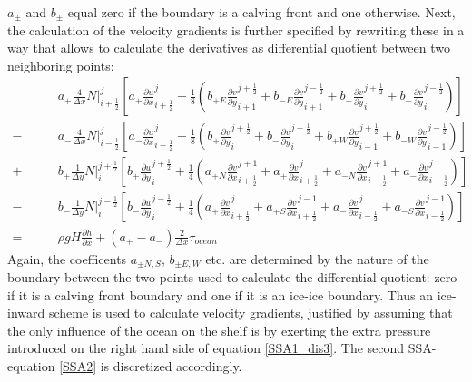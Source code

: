 \documentclass[a4paper,10pt]{article}
\begin{document}
$a_\pm$ and $b_\pm$ equal zero if the boundary is a calving front and one otherwise. Next, the calculation of the velocity gradients is further specified by rewriting these in a way that allows to calculate the derivatives as differential quotient between two neighboring points:
\begin{align}
&\qquad a_+\frac{4}{\Delta x}N|_{i+\frac{1}{2}}^j\left[ a_+\frac{\partial u}{\partial x}_{i+\frac{1}{2}}^j + \frac{1}{8}\left( b_{+E}\frac{\partial v}{\partial y}_{i+1}^{j+\frac{1}{2}}+b_{-E}\frac{\partial v}{\partial y}_{i+1}^{j-\frac{1}{2}}+b_+\frac{\partial v}{\partial y}_{i}^{j+\frac{1}{2}}+b_-\frac{\partial v}{\partial y}_{i}^{j-\frac{1}{2}}  \right) \right] \nonumber \\
- &\qquad a_-\frac{4}{\Delta x}N|_{i-\frac{1}{2}}^j\left[ a_-\frac{\partial u}{\partial x}_{i-\frac{1}{2}}^j + \frac{1}{8}\left( b_+\frac{\partial v}{\partial y}_{i}^{j+\frac{1}{2}} + b_-\frac{\partial v}{\partial y}_{i}^{j-\frac{1}{2}} + b_{+W}\frac{\partial v}{\partial y}_{i-1}^{j+\frac{1}{2}} + b_{-W}\frac{\partial v}{\partial y}_{i-1}^{j-\frac{1}{2}} \right) \right] \nonumber \\
+ &\qquad b_+\frac{1}{\Delta y}N|_i^{j+\frac{1}{2}}\left[ b_+\frac{\partial u}{\partial y}_i^{j+\frac{1}{2}}+\frac{1}{4}\left( a_{+N}\frac{\partial v}{\partial x}_{i+\frac{1}{2}}^{j+1} + a_+\frac{\partial v}{\partial x}_{i+\frac{1}{2}}^{j} + a_{-N}\frac{\partial v}{\partial x}_{i-\frac{1}{2}}^{j+1} + a_-\frac{\partial v}{\partial x}_{i-\frac{1}{2}}^{j} \right) \right] \nonumber \\
- &\qquad b_-\frac{1}{\Delta y} N|_i^{j-\frac{1}{2}} \left[ b_-\frac{\partial u}{\partial y}_i^{j-\frac{1}{2}}+\frac{1}{4}\left( a_+\frac{\partial v}{\partial x}_{i+\frac{1}{2}}^{j} + a_{+S}\frac{\partial v}{\partial x}_{i+\frac{1}{2}}^{j-1} + a_-\frac{\partial v}{\partial x}_{i-\frac{1}{2}}^{j} + a_{-S}\frac{\partial v}{\partial x}_{i-\frac{1}{2}}^{j-1} \right) \right] \nonumber \\
= &\qquad \rho gH \frac{\partial h}{\partial x} + (a_+ - a_-)\frac{2}{\Delta x}\tau_{ocean} \label{SSA1_dis3}
\end{align}
Again, the coefficents $a_{\pm N,S}$, $b_{\pm E,W}$ etc. are determined by the nature of the boundary between the two points used to calculate the differential quotient: zero if it is a calving front boundary and one if it is an ice-ice boundary. Thus an ice-inward scheme is used to calculate velocity gradients,  justified by assuming that the only influence of the ocean on the shelf is by exerting the extra pressure introduced on the right hand side of equation \eqref{SSA1_dis3}. The second SSA-equation \eqref{SSA2} is discretized accordingly.
\end{document}
